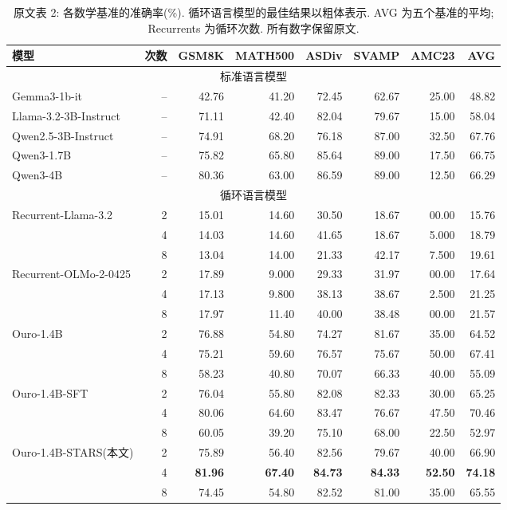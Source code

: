 \begin{table}[p]
\centering
\caption{原文表 2: 各数学基准的准确率(\%). 循环语言模型的最佳结果以粗体表示. AVG 为五个基准的平均; Recurrents 为循环次数. 所有数字保留原文.}\label{stars-tab-2}
\begingroup\setlength{\tabcolsep}{3pt}
\begin{tabular}{lrrrrrrr}\toprule
模型 & 次数 & GSM8K & MATH500 & ASDiv & SVAMP & AMC23 & AVG\\\midrule
\multicolumn{8}{c}{标准语言模型}\\
Gemma3-1b-it\cite{stars-team2025gemma} & -- & 42.76 & 41.20 & 72.45 & 62.67 & 25.00 & 48.82\\
Llama-3.2-3B-Instruct\cite{stars-grattafiori2024llama} & -- & 71.11 & 42.40 & 82.04 & 79.67 & 15.00 & 58.04\\
Qwen2.5-3B-Instruct\cite{stars-team2024qwen2} & -- & 74.91 & 68.20 & 76.18 & 87.00 & 32.50 & 67.76\\
Qwen3-1.7B\cite{stars-yang2025qwen3} & -- & 75.82 & 65.80 & 85.64 & 89.00 & 17.50 & 66.75\\
Qwen3-4B\cite{stars-yang2025qwen3} & -- & 80.36 & 63.00 & 86.59 & 89.00 & 12.50 & 66.29\\\midrule
\multicolumn{8}{c}{循环语言模型}\\
Recurrent-Llama-3.2\cite{stars-mcleish2025teaching} & 2 & 15.01 & 14.60 & 30.50 & 18.67 & 00.00 & 15.76\\
 & 4 & 14.03 & 14.60 & 41.65 & 18.67 & 5.000 & 18.79\\
 & 8 & 13.04 & 14.00 & 21.33 & 42.17 & 7.500 & 19.61\\\midrule
Recurrent-OLMo-2-0425\cite{stars-mcleish2025teaching} & 2 & 17.89 & 9.000 & 29.33 & 31.97 & 00.00 & 17.64\\
 & 4 & 17.13 & 9.800 & 38.13 & 38.67 & 2.500 & 21.25\\
 & 8 & 17.97 & 11.40 & 40.00 & 38.48 & 00.00 & 21.57\\\midrule
Ouro-1.4B\cite{stars-zhu2025scaling} & 2 & 76.88 & 54.80 & 74.27 & 81.67 & 35.00 & 64.52\\
 & 4 & 75.21 & 59.60 & 76.57 & 75.67 & 50.00 & 67.41\\
 & 8 & 58.23 & 40.80 & 70.07 & 66.33 & 40.00 & 55.09\\\midrule
Ouro-1.4B-SFT & 2 & 76.04 & 55.80 & 82.08 & 82.33 & 30.00 & 65.25\\
 & 4 & 80.06 & 64.60 & 83.47 & 76.67 & 47.50 & 70.46\\
 & 8 & 60.05 & 39.20 & 75.10 & 68.00 & 22.50 & 52.97\\\midrule
Ouro-1.4B-STARS(本文) & 2 & 75.89 & 56.40 & 82.56 & 79.67 & 40.00 & 66.90\\
 & 4 & \textbf{81.96} & \textbf{67.40} & \textbf{84.73} & \textbf{84.33} & \textbf{52.50} & \textbf{74.18}\\
 & 8 & 74.45 & 54.80 & 82.52 & 81.00 & 35.00 & 65.55\\\bottomrule
\end{tabular}
\endgroup
\end{table}

